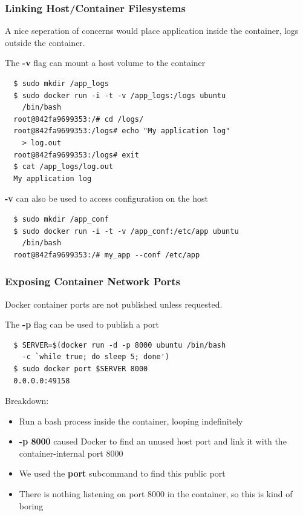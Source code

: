 \documentclass[xcolor=dvipsnames]{beamer}
\newcommand{\cpause}{}
\begin{document}
\begin{frame}[fragile]
 \frametitle{Linking Host/Container Filesystems}

 \vspace{-2mm}
 A nice seperation of concerns would place application inside the container, logs outside the container. \cpause

 The \textbf{-v} flag can mount a host volume to the container\cpause

  \vspace{-1mm}
  \begin{lstlisting}
  $ sudo mkdir /app_logs
  $ sudo docker run -i -t -v /app_logs:/logs ubuntu 
    /bin/bash
  root@842fa9699353:/# cd /logs/
  root@842fa9699353:/logs# echo "My application log" 
    > log.out
  root@842fa9699353:/logs# exit
  $ cat /app_logs/log.out
  My application log
  \end{lstlisting}
  \vspace{-1mm}
  \cpause

  \textbf{-v} can also be used to access configuration on the host
  \cpause

  \vspace{-1mm}
  \begin{lstlisting}
  $ sudo mkdir /app_conf
  $ sudo docker run -i -t -v /app_conf:/etc/app ubuntu 
    /bin/bash
  root@842fa9699353:/# my_app --conf /etc/app
  \end{lstlisting}  

\end{frame}


\begin{frame}[fragile]
 \frametitle{Exposing Container Network Ports}

  Docker container ports are not published unless requested. \cpause

  The \textbf{-p} flag can be used to publish a port \cpause

  \begin{lstlisting}
  $ SERVER=$(docker run -d -p 8000 ubuntu /bin/bash 
    -c `while true; do sleep 5; done')
  $ sudo docker port $SERVER 8000
  0.0.0.0:49158
  \end{lstlisting}
  \cpause

  Breakdown: 
  \begin{itemize}
  \item Run a bash process inside the container, looping indefinitely \cpause
  \item \textbf{-p 8000} caused Docker to find an unused host port and link it with the container-internal port 8000 \cpause
  \item We used the \textbf{port} subcommand to find this public port \cpause
  \item There is nothing listening on port 8000 in the container, so this is 
  kind of boring
  \end{itemize}

\end{frame}
\end{document}
